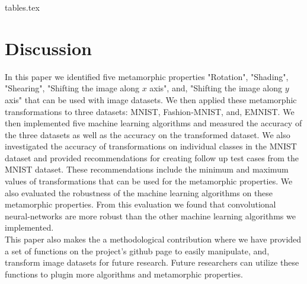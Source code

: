 {tables.tex}

\newpage
\section{Discussion}
In this paper we identified five metamorphic properties "Rotation", "Shading", "Shearing", "Shifting the image along $x$ axis", and, "Shifting the image along $y$ axis" that can be used with image datasets. We then applied these metamorphic transformations to three datasets: MNIST, Fashion-MNIST, and, EMNIST. We then implemented five machine learning algorithms and measured the accuracy of the three datasets as well as the accuracy on the transformed dataset. We also investigated the accuracy of transformations on individual classes in the MNIST dataset and provided recommendations for creating follow up test cases from the MNIST dataset. These recommendations include the minimum and maximum values of transformations that can be used for the metamorphic properties. We also evaluated the robustness of the machine learning algorithms on these metamorphic properties. From this evaluation we found that convolutional neural-networks are more robust than the other machine learning algorithms we implemented. \\
This paper also makes the a methodological contribution where we have provided a set of functions on the project's github page to easily manipulate, and, transform image datasets for future research. 
Future researchers can utilize these functions to plugin more algorithms and metamorphic properties.





